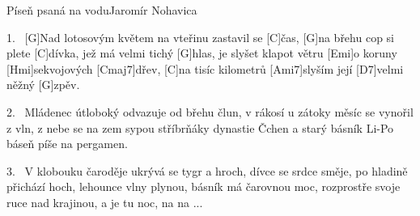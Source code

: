 \begin{song}{Píseň psaná na vodu}{Jaromír Nohavica}

\begin{xverse}{1.~}
[\large G]Nad lotosovým květem na vteřinu zastavil se [\large C]{čas},
[\large G]na břehu cop si plete [\large C]dívka, jež má velmi tichý [\large G]hlas,
je slyšet klapot větru [\large Emi]o koruny [\large Hmi]sekvojových [\large Cmaj7]dřev,
[\large C]na tisíc kilometrů [\large Ami7]slyším její [\large D7]velmi něžný [\large G]zpěv.
\end{xverse}

\begin{xverse}{2.~}
Mládenec útloboký odvazuje od břehu člun,
v rákosí u zátoky měsíc se vynořil z vln,
z nebe se na zem sypou stříbrňáky dynastie Čchen
a starý básník Li-Po báseň píše na pergamen.
\end{xverse}

\begin{xverse}{3.~}
V klobouku čaroděje ukrývá se tygr a hroch,
dívce se srdce směje, po hladině přichází hoch,
lehounce vlny plynou, básník má čarovnou moc,
rozprostře svoje ruce nad krajinou, a je tu noc, na na ...
\end{xverse}

\end{song}

